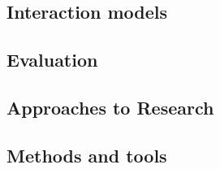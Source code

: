 \subsection{Interaction models}

\subsection{Evaluation}

\subsection{Approaches to Research}
\subsection{Methods and tools}







 





